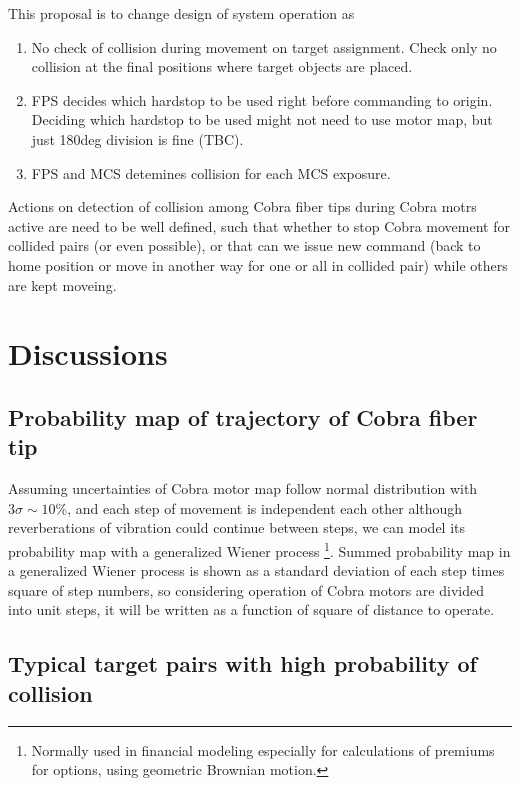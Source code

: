 \documentclass[a4paper,notitlepage]{article}
\begin{document}
This proposal is to change design of system operation as

\begin{enumerate}
  \item No check of collision during movement on target assignment.
    Check only no collision at the final positions where target objects are 
    placed.
  \item FPS decides which hardstop to be used right before commanding to origin.
    Deciding which hardstop to be used might not need to use motor map, but 
    just 180deg division is fine (TBC).
  \item FPS and MCS detemines collision for each MCS exposure.
\end{enumerate}

Actions on detection of collision among Cobra fiber tips during Cobra motrs 
active are need to be well defined, such that whether to stop Cobra movement 
for collided pairs (or even possible), or that can we issue new command (back 
to home position or move in another way for one or all in collided pair) 
while others are kept moveing. 

\section{Discussions}

\subsection{Probability map of trajectory of Cobra fiber tip}

Assuming uncertainties of Cobra motor map follow normal distribution with 
$3\sigma\sim 10\%$, and each step of movement is independent each other 
although reverberations of vibration could continue between steps, we can 
model its probability map with a generalized Wiener process
\footnote{Normally used in financial modeling especially for calculations of 
premiums for options, using geometric Brownian motion.}.
Summed probability map in a generalized Wiener process is shown as a standard 
deviation of each step times square of step numbers, so considering operation 
of Cobra motors are divided into unit steps, it will be written as a function 
of square of distance to operate. 


\subsection{Typical target pairs with high probability of collision}
\end{document}
